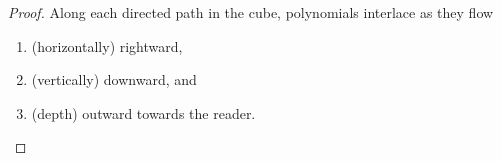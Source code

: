 \documentclass[11pt,a4paper]{amsart}
\theoremstyle{results}
\newtheorem{lemma}[thm]{Lemma}
\theoremstyle{definitions}
\begin{document}

\begin{proof}
    Along each directed path in the cube, polynomials interlace as they flow
    \begin{enumerate}[label=(\Alph*)]
        \item \label{item:cubical-horizontal} (horizontally) rightward, 
        \item \label{item:cubical-vertical} (vertically) downward, and 
        \item \label{item:cubical-depth} (depth) outward towards the reader. 
    \end{enumerate}
    

\end{proof}
\end{document}
